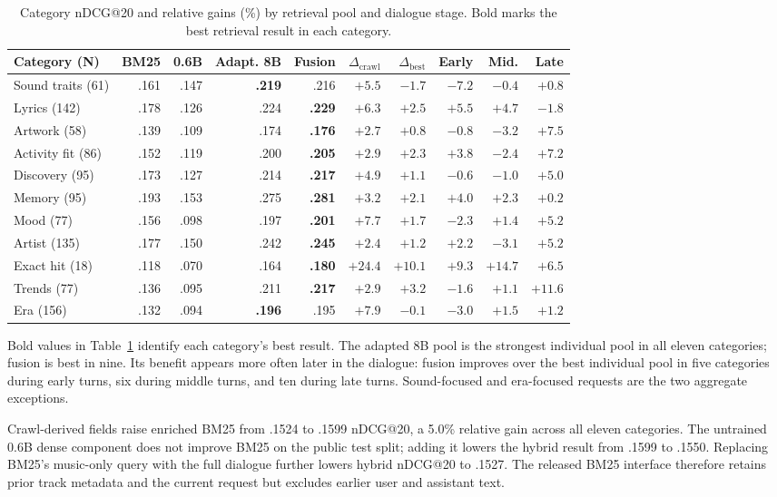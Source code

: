 \begin{table}[!h]
  \caption{Category nDCG@20 and relative gains (\%) by retrieval pool and
  dialogue stage. Bold marks the best retrieval result in each category.}
  \label{tab:pool-category}
  \centering
  \fontsize{6}{6.9}\selectfont
  \setlength{\tabcolsep}{1.7pt}
  \begin{tabular}{@{}lrrrrrrrrr@{}}
    \toprule
    Category (N) & BM25 & 0.6B & Adapt. 8B & Fusion & $\Delta_{\mathrm{crawl}}$ & $\Delta_{\mathrm{best}}$ & Early & Mid. & Late \\
    \midrule
    Sound traits (61) & .161 & .147 & \textbf{.219} & .216 & $+5.5$ & $-1.7$ & $-7.2$ & $-0.4$ & $+0.8$ \\
    Lyrics (142) & .178 & .126 & .224 & \textbf{.229} & $+6.3$ & $+2.5$ & $+5.5$ & $+4.7$ & $-1.8$ \\
    Artwork (58) & .139 & .109 & .174 & \textbf{.176} & $+2.7$ & $+0.8$ & $-0.8$ & $-3.2$ & $+7.5$ \\
    Activity fit (86) & .152 & .119 & .200 & \textbf{.205} & $+2.9$ & $+2.3$ & $+3.8$ & $-2.4$ & $+7.2$ \\
    Discovery (95) & .173 & .127 & .214 & \textbf{.217} & $+4.9$ & $+1.1$ & $-0.6$ & $-1.0$ & $+5.0$ \\
    Memory (95) & .193 & .153 & .275 & \textbf{.281} & $+3.2$ & $+2.1$ & $+4.0$ & $+2.3$ & $+0.2$ \\
    Mood (77) & .156 & .098 & .197 & \textbf{.201} & $+7.7$ & $+1.7$ & $-2.3$ & $+1.4$ & $+5.2$ \\
    Artist (135) & .177 & .150 & .242 & \textbf{.245} & $+2.4$ & $+1.2$ & $+2.2$ & $-3.1$ & $+5.2$ \\
    Exact hit (18) & .118 & .070 & .164 & \textbf{.180} & $+24.4$ & $+10.1$ & $+9.3$ & $+14.7$ & $+6.5$ \\
    Trends (77) & .136 & .095 & .211 & \textbf{.217} & $+2.9$ & $+3.2$ & $-1.6$ & $+1.1$ & $+11.6$ \\
    Era (156) & .132 & .094 & \textbf{.196} & .195 & $+7.9$ & $-0.1$ & $-3.0$ & $+1.5$ & $+1.2$ \\
    \bottomrule
  \end{tabular}
\end{table}

Bold values in Table~\ref{tab:pool-category} identify each category's best
result. The adapted 8B pool is the strongest individual pool in all eleven
categories; fusion is best in nine. Its benefit appears
more often later in the dialogue: fusion improves over the best individual pool
in five categories during early turns, six during middle turns, and ten during
late turns.
Sound-focused and era-focused requests are the two aggregate exceptions.

Crawl-derived fields raise enriched BM25 from .1524 to .1599 nDCG@20, a 5.0\%
relative gain across all eleven categories. The untrained 0.6B
dense component does not improve BM25 on the public test split; adding it
lowers the hybrid result from .1599 to .1550. Replacing BM25's music-only query
with the full dialogue further lowers hybrid nDCG@20 to .1527. The released
BM25 interface therefore retains prior track metadata and the current request
but excludes earlier user and assistant text.